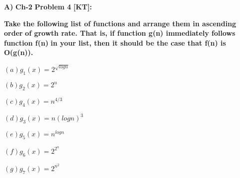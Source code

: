 \documentclass[letterpaper,portrait,12pt]{article}
\begin{document}
\begin{flushleft}

\end{flushleft}


\begin{flushleft}
\textbf{A) }\textbf{Ch}\textbf{-}\textbf{2 }\textbf{Probl}\textbf{em 4}\textbf{ }\textbf{[}\textbf{KT}\textbf{]}\textbf{:}
\end{flushleft}


\begin{flushleft}
\textbf{	}\textbf{Take the following list of functions and arrange them in ascending order}\textbf{ }\textbf{of growth rate. That is, if function g(n) immediately follows function f(n)}\textbf{ i}\textbf{n your list, then it should be the case that f(n) is O(g(n)).}
\end{flushleft}


\begin{flushleft}

\end{flushleft}


\begin{flushleft}
$(a)g_1(x)=2^\sqrt{logn} 
$
\end{flushleft}


\begin{flushleft}
$(b)g_2(x)=2^n 
$
\end{flushleft}


\begin{flushleft}
$(c)g_4(x)=n^{4/3}



$
\end{flushleft}


\begin{flushleft}
$(d)g_3(x)=n(logn)^3$
\end{flushleft}


\begin{flushleft}
$(e)g_5(x)=n^{logn}
$
\end{flushleft}


\begin{flushleft}
$(f)g_6(x)=2^{2^{n}}$
\end{flushleft}


\begin{flushleft}
$(g)g_7(x)=2^{n^{2}}$
\end{flushleft}


\begin{flushleft}

\end{flushleft}
\end{document}
